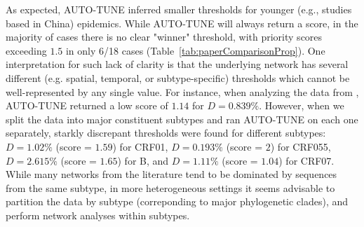 \documentclass[utf8]{FrontiersinHarvard} %
\begin{document}
As expected, AUTO-TUNE inferred smaller thresholds for younger (e.g., studies
based in China) epidemics. While AUTO-TUNE will always return a score, in the
majority of cases there is no clear "winner" threshold, with priority scores
exceeding $1.5$ in only 6/18 cases (Table~\ref{tab:paperComparisonProp}). One
interpretation for such lack of clarity is that the underlying network has
several different (e.g. spatial, temporal, or subtype-specific) thresholds
which cannot be well-represented by any single value.  For instance, when
analyzing the data from \citet{Yan:2021aa}, AUTO-TUNE returned a low score of
$1.14$ for $D=0.839\%$. However, when we split the  data into major constituent
subtypes and ran AUTO-TUNE on each one separately, starkly discrepant
thresholds were found for different subtypes: $D=1.02\%$ (score = $1.59$) for
CRF01,   $D=0.193\%$ (score = $2$) for CRF055,  $D=2.615\%$ (score = $1.65$)
for B,  and $D=1.11\%$ (score = $1.04$) for CRF07. While many networks from the
literature tend to be dominated by sequences from the same subtype, in more
heterogeneous settings it seems advisable to partition the data by subtype
(correponding to major phylogenetic clades), and perform network analyses
within subtypes. 
\end{document}
